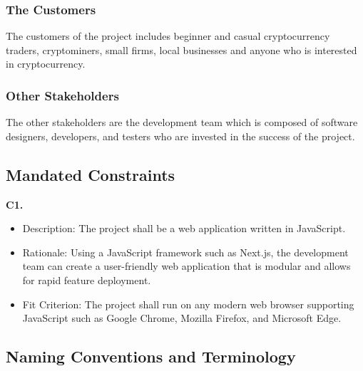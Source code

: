 \documentclass[12pt, titlepage]{article}
\begin{document}
\subsubsection{The Customers}

The customers of the project includes beginner and casual cryptocurrency traders, cryptominers, small firms, local businesses and anyone who is interested in cryptocurrency.

\subsubsection{Other Stakeholders}

The other stakeholders are the development team which is composed of software designers, developers, and testers who are invested in the success of the project. 

\subsection{Mandated Constraints}
\textbf{C1.}
\begin{itemize}
    \item Description: The project shall be a web application written in JavaScript.
    \item Rationale: Using a JavaScript framework such as Next.js, the development team can create a user-friendly web application that is modular and allows for rapid feature deployment.
    \item Fit Criterion: The project shall run on any modern web browser supporting JavaScript such as Google Chrome, Mozilla Firefox, and Microsoft Edge.
\end{itemize}

\subsection{Naming Conventions and Terminology}
\end{document}
